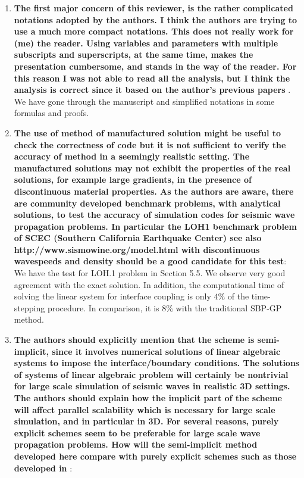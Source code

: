 \documentclass[twoside,11pt]{article}
\begin{document}
\begin{enumerate}
\item \textbf{The first major concern of this reviewer, is the rather complicated notations adopted by the authors. I think the authors are trying to use a much more compact notations. This does not really work for (me) the reader. Using variables and parameters with multiple subscripts and superscripts, at the same time, makes the presentation cumbersome, and stands in the way of the reader. For this reason I was not able to read all the analysis, but I think the analysis is correct since it based on the author’s previous papers} \cite{petersson2009stable,wang2019fourth,petersson2015wave}.\\
 We have gone through the manuscript and simplified notations in some formulas and proofs.

\item  \textbf{The use of method of manufactured solution might be useful to check the correctness of code but it is not sufficient to verify the accuracy of method in a seemingly realistic setting. The manufactured solutions may not exhibit the properties of the real solutions, for example large gradients, in the presence of discontinuous material properties. As the authors are aware, there are community developed benchmark problems, with analytical solutions, to test the accuracy of simulation codes for seismic wave propagation problems. In particular the LOH1 benchmark problem of SCEC (Southern California Earthquake Center) see also http://www.sismowine.org/model.html with discontinuous wavespeeds and density should be a good candidate for this test}: We have the test for LOH.1 problem in Section 5.5. We observe very good agreement with the exact solution. In addition, the computational time of solving the linear system for interface coupling is only $4\%$ of the time-stepping procedure. In comparison, it is $8\%$ with the traditional SBP-GP method.

\item  \textbf{The authors should explicitly mention that the scheme is semi-implicit, since it involves numerical solutions of linear algebraic systems to impose the interface/boundary conditions. The solutions of systems of linear algebraic problem will certainly be nontrivial for large scale simulation of seismic waves in realistic 3D settings. The authors should explain how the implicit part of the scheme will affect parallel scalability which is necessary for large scale simulation, and in particular in 3D. For several reasons, purely explicit schemes seem to be preferable for large scale wave propagation problems. How will the semi-implicit method developed here compare with purely explicit schemes such as those developed in} \cite{virta2014acoustic,duru2014stable}: 


\end{enumerate}
\end{document}
